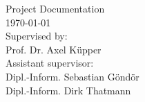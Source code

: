 \begin{titlepage}
\begin{center}
		Project Documentation\\
		\vspace{2.2cm}
		\today\\
		\vspace{2.0cm}
		\large
		Supervised by:\\
		Prof. Dr. Axel Küpper\\
		\vspace{1cm}
		Assistant supervisor:\\
		Dipl.-Inform. Sebastian Göndör \\
		Dipl.-Inform. Dirk Thatmann
		\end{center}
\end{titlepage}

